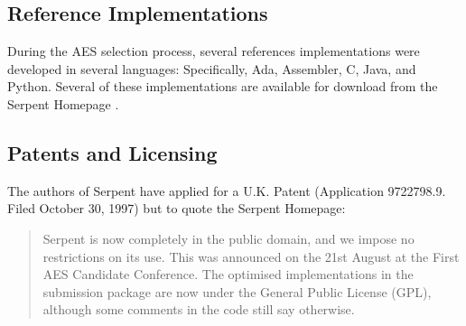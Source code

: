 \subsection{Reference Implementations}

During the AES selection process, several references implementations were developed in several languages: Specifically, Ada, Assembler, C, Java, and Python.\cite[16]{submission} Several of these implementations are available for download from the Serpent Homepage \cite{homepage}.

\subsection{Patents and Licensing}

The authors of Serpent have applied for a U.K. Patent (Application 9722798.9. Filed October 30, 1997) \cite{scan} but to quote the Serpent Homepage:
\blockquote[\cite{homepage}]{Serpent is now completely in the public domain, and we impose no restrictions on its use. This was announced on the 21st August at the First AES Candidate Conference. The optimised implementations in the submission package are now under the General Public License (GPL), although some comments in the code still say otherwise.}

